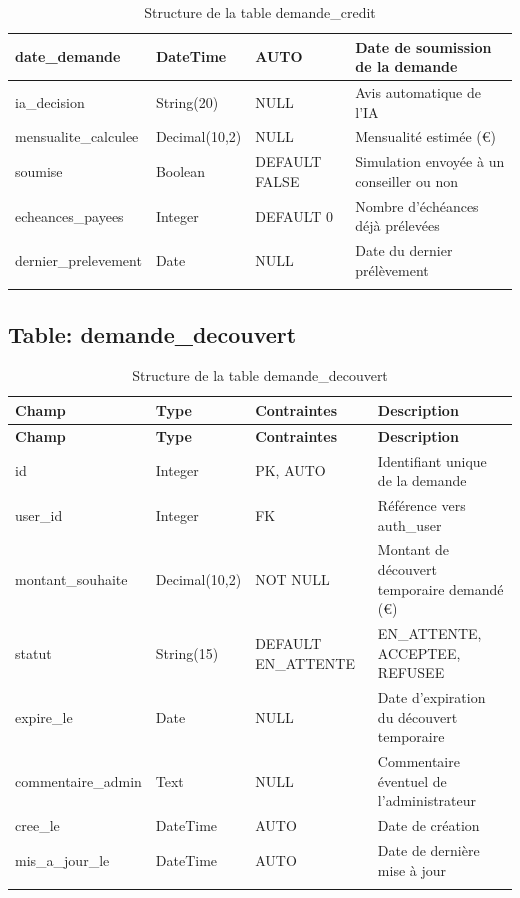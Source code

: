 \documentclass[12pt,a4paper]{report}
\begin{document}
\begin{longtable}{|p{3.5cm}|p{2.5cm}|p{2cm}|p{6cm}|}
\hline
date\_demande & DateTime & AUTO & Date de soumission de la demande \\
\hline
ia\_decision & String(20) & NULL & Avis automatique de l'IA \\
\hline
mensualite\_calculee & Decimal(10,2) & NULL & Mensualité estimée (€) \\
\hline
soumise & Boolean & DEFAULT FALSE & Simulation envoyée à un conseiller ou non \\
\hline
echeances\_payees & Integer & DEFAULT 0 & Nombre d'échéances déjà prélevées \\
\hline
dernier\_prelevement & Date & NULL & Date du dernier prélèvement \\
\hline

\caption{Structure de la table demande\_credit}
\end{longtable}

\subsection{Table: demande\_decouvert}
\begin{longtable}{|p{3.5cm}|p{2.5cm}|p{2cm}|p{6cm}|}
\hline
\rowcolor{banquiseblue!30}
\textbf{Champ} & \textbf{Type} & \textbf{Contraintes} & \textbf{Description} \\
\hline
\endfirsthead
\hline
\rowcolor{banquiseblue!30}
\textbf{Champ} & \textbf{Type} & \textbf{Contraintes} & \textbf{Description} \\
\hline
\endhead

id & Integer & PK, AUTO & Identifiant unique de la demande \\
\hline
user\_id & Integer & FK & Référence vers auth\_user \\
\hline
montant\_souhaite & Decimal(10,2) & NOT NULL & Montant de découvert temporaire demandé (€) \\
\hline
statut & String(15) & DEFAULT EN\_ATTENTE & EN\_ATTENTE, ACCEPTEE, REFUSEE \\
\hline
expire\_le & Date & NULL & Date d'expiration du découvert temporaire \\
\hline
commentaire\_admin & Text & NULL & Commentaire éventuel de l'administrateur \\
\hline
cree\_le & DateTime & AUTO & Date de création \\
\hline
mis\_a\_jour\_le & DateTime & AUTO & Date de dernière mise à jour \\
\hline

\caption{Structure de la table demande\_decouvert}
\end{longtable}
\end{document}
